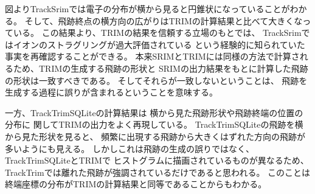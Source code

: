 \documentclass [11pt,a4paper,dvipdfmx] {jarticle}
\begin{document}
図よりTrackSrimでは電子の分布が横から見ると円錐状になっていることがわかる。
そして、飛跡終点の横方向の広がりはTRIMの計算結果と比べて大きくなっている。
この結果より、TRIMの結果を信頼する立場のもとでは、
TrackSrimではイオンのストラグリングが過大評価されている
という経験的に知られていた事実を再確認することができる。
本来SRIMとTRIMには同様の方法で計算されるため、TRIMの生成する飛跡の形状と
SRIMの出力結果をもとに計算した飛跡の形状は一致すべきである。
そしてそれらが一致しないということは、
飛跡を生成する過程に誤りが含まれるということを意味する。

一方、TrackTrimSQLiteの計算結果は
横から見た飛跡形状や飛跡終端の位置の分布に
関してTRIMの出力をよく再現している。
TrackTrimSQLiteの飛跡を横から見た形状を見ると、
頻繁に出現する飛跡から大きくはずれた方向の飛跡が多いようにも見える。
しかしこれは飛跡の生成の誤りではなく、TrackTrimSQLiteとTRIMで
ヒストグラムに描画されているものが異なるため、
TrackTrimでは離れた飛跡が強調されているだけであると思われる。
このことは終端座標の分布がTRIMの計算結果と同等であることからもわかる。
\end{document}
